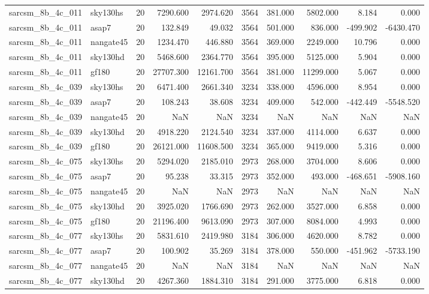 \documentclass{article}
\begin{document}
\begin{longtable}{llrrrrrrrr}
sarcsm\_8b\_4c\_011 & sky130hs & 20 & 7290.600 & 2974.620 & 3564 & 381.000 & 5802.000 & 8.184 & 0.000 \\
sarcsm\_8b\_4c\_011 & asap7 & 20 & 132.849 & 49.032 & 3564 & 501.000 & 836.000 & -499.902 & -6430.470 \\
sarcsm\_8b\_4c\_011 & nangate45 & 20 & 1234.470 & 446.880 & 3564 & 369.000 & 2249.000 & 10.796 & 0.000 \\
sarcsm\_8b\_4c\_011 & sky130hd & 20 & 5468.600 & 2364.770 & 3564 & 395.000 & 5125.000 & 5.904 & 0.000 \\
sarcsm\_8b\_4c\_011 & gf180 & 20 & 27707.300 & 12161.700 & 3564 & 381.000 & 11299.000 & 5.067 & 0.000 \\
sarcsm\_8b\_4c\_039 & sky130hs & 20 & 6471.400 & 2661.340 & 3234 & 338.000 & 4596.000 & 8.954 & 0.000 \\
sarcsm\_8b\_4c\_039 & asap7 & 20 & 108.243 & 38.608 & 3234 & 409.000 & 542.000 & -442.449 & -5548.520 \\
sarcsm\_8b\_4c\_039 & nangate45 & 20 & NaN & NaN & 3234 & NaN & NaN & NaN & NaN \\
sarcsm\_8b\_4c\_039 & sky130hd & 20 & 4918.220 & 2124.540 & 3234 & 337.000 & 4114.000 & 6.637 & 0.000 \\
sarcsm\_8b\_4c\_039 & gf180 & 20 & 26121.000 & 11608.500 & 3234 & 365.000 & 9419.000 & 5.316 & 0.000 \\
sarcsm\_8b\_4c\_075 & sky130hs & 20 & 5294.020 & 2185.010 & 2973 & 268.000 & 3704.000 & 8.606 & 0.000 \\
sarcsm\_8b\_4c\_075 & asap7 & 20 & 95.238 & 33.315 & 2973 & 352.000 & 493.000 & -468.651 & -5908.160 \\
sarcsm\_8b\_4c\_075 & nangate45 & 20 & NaN & NaN & 2973 & NaN & NaN & NaN & NaN \\
sarcsm\_8b\_4c\_075 & sky130hd & 20 & 3925.020 & 1766.690 & 2973 & 262.000 & 3527.000 & 6.858 & 0.000 \\
sarcsm\_8b\_4c\_075 & gf180 & 20 & 21196.400 & 9613.090 & 2973 & 307.000 & 8084.000 & 4.993 & 0.000 \\
sarcsm\_8b\_4c\_077 & sky130hs & 20 & 5831.610 & 2419.980 & 3184 & 306.000 & 4620.000 & 8.782 & 0.000 \\
sarcsm\_8b\_4c\_077 & asap7 & 20 & 100.902 & 35.269 & 3184 & 378.000 & 550.000 & -451.962 & -5733.190 \\
sarcsm\_8b\_4c\_077 & nangate45 & 20 & NaN & NaN & 3184 & NaN & NaN & NaN & NaN \\
sarcsm\_8b\_4c\_077 & sky130hd & 20 & 4267.360 & 1884.310 & 3184 & 291.000 & 3775.000 & 6.818 & 0.000 \\

\end{longtable}
\end{document}
